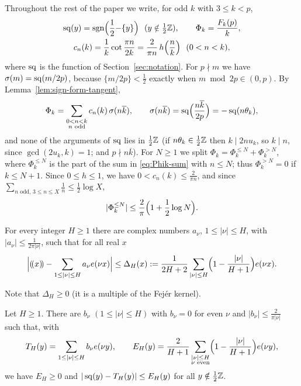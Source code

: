 Throughout the rest of the paper we write, for odd $k$ with $3\le k<p$,
\begin{gather*}
\sq(y)=\sgn\Bigl(\frac12{-}\{y\}\Bigr)\ \ (y\notin\tfrac12\Z),\qquad
\Phi_k=\frac{F_k(p)}{k},\\
c_n(k)=\frac1k\cot\frac{\pi n}{2k}=\frac2{\pi n}\,h\Bigl(\frac nk\Bigr)\ \ (0<n<k),
\end{gather*}
where $\operatorname{sq}$ is the function of Section~\ref{sec:notation}. For $p\nmid m$ we have $\sigma(m)=\operatorname{sq}(m/2p)$, because $\{m/2p\}<\frac12$ exactly when $m\bmod2p\in(0,p)$. By
Lemma~\ref{lem:sign-form-tangent},
\begin{equation}\label{eq:Phik-sum}
\Phi_k=\sum_{\substack{0<n<k\\ n\text{ odd}}}c_n(k)\,\sigma(n\overline{k}),\qquad
\sigma(n\overline{k})=\operatorname{sq}\Bigl(\frac{n\overline{k}}{2p}\Bigr)=-\operatorname{sq}(n\theta_k),
\end{equation}
and none of the arguments of $\operatorname{sq}$ lies in $\frac12\mathbb{Z}$ (if $n\theta_k\in\frac12\mathbb{Z}$ then $k\mid2nu_k$, so $k\mid n$, since $\gcd(2u_k,k)=1$; and $p\nmid n\overline{k}$). For
$N\ge1$ we split $\Phi_k=\Phi_k^{\le N}+\Phi_k^{>N}$, where $\Phi_k^{\le N}$ is the part of the sum in
\eqref{eq:Phik-sum} with $n\le N$; thus $\Phi_k^{>N}=0$ if $k\le N+1$. Since $0\le h\le1$, we have
$0<c_n(k)\le\frac2{\pi n}$, and since $\sum_{n\text{ odd},\,3\le n\le X}\frac1n\le\frac12\log X$,
\begin{equation}\label{eq:head-trivial}
|\Phi_k^{\le N}|\le\frac2\pi\Bigl(1+\frac12\log N\Bigr).
\end{equation}

\begin{lemma}\label{lem:vaaler}
For every integer $H\ge1$ there are complex numbers $a_\nu$, $1\le|\nu|\le H$, with $|a_\nu|\le\frac1{2\pi|\nu|}$,
such that for all real $x$
\[
\Big|(\!(x)\!)-\sum_{1\le|\nu|\le H}a_\nu e(\nu x)\Big|\le\Delta_H(x):=\frac1{2H+2}\sum_{|\nu|\le H}
\Bigl(1-\frac{|\nu|}{H+1}\Bigr)e(\nu x).
\]
\end{lemma}

Note that $\Delta_H\ge0$ (it is a multiple of the Fej\'er kernel).

\begin{lemma}\label{lem:square-wave}
Let $H\ge1$. There are $b_\nu$ $(1\le|\nu|\le H)$ with $b_\nu=0$ for even $\nu$ and $|b_\nu|\le\frac2{\pi|\nu|}$
such that, with
\[
T_H(y)=\sum_{1\le|\nu|\le H}b_\nu e(\nu y),\qquad E_H(y)=\frac2{H+1}\sum_{\substack{|\nu|\le H\\ \nu\text{ even}}}
\Bigl(1-\frac{|\nu|}{H+1}\Bigr)e(\nu y),
\]
we have $E_H\ge0$ and $|\operatorname{sq}(y)-T_H(y)|\le E_H(y)$ for all $y\notin\frac12\mathbb{Z}$.
\end{lemma}

